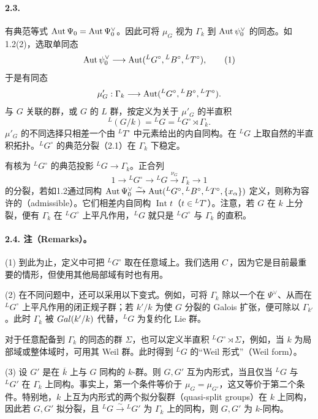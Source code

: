 \paragraph*{2.3.} 有典范等式 $\operatorname{Aut}\Psi_0=\operatorname{Aut}\Psi_0^\vee$。因此可将 $\mu_G$ 视为 $\Gamma_k$ 到 $\operatorname{Aut}\psi_0^\vee$ 的同态。如1.2(2)，选取单同态
\begin{equation}
 \operatorname{Aut}\psi_0^\vee\longrightarrow\operatorname{Aut}({}^LG^\circ,{}^LB^\circ,{}^LT^\circ),\tag{1}
\end{equation}
于是有同态
\[
 \mu'_G:\Gamma_k\longrightarrow\operatorname{Aut}({}^LG^\circ,{}^LB^\circ,{}^LT^\circ).
\]
与 $G$ 关联的群，或 $G$ 的 $L$ 群，按定义为关于 $\mu'_G$ 的半直积
\begin{equation}
 {}^L(G/k)={}^LG={}^LG^\circ\rtimes\Gamma_k.\tag{2}
\end{equation}
$\mu'_G$ 的不同选择只相差一个由 ${}^LT^\circ$ 中元素给出的内自同构。在 ${}^LG$ 上取自然的半直积拓扑。${}^LG^\circ$ 的典范分裂（2.1）在 $\Gamma_k$ 下稳定。

有核为 ${}^LG^\circ$ 的典范投影 ${}^LG\to\Gamma_k$。正合列
\begin{equation}
 1\longrightarrow{}^LG^\circ\longrightarrow{}^LG\xrightarrow{\nu_G}\Gamma_k\longrightarrow1\tag{3}
\end{equation}
的分裂，若如1.2通过同构 $\operatorname{Aut}\Psi_0^\vee\xrightarrow{\sim}\operatorname{Aut}({}^LG^\circ,{}^LB^\circ,{}^LT^\circ,\{x_\alpha\})$ 定义，则称为容许的（admissible）。它们相差内自同构 $\operatorname{Int}t$（$t\in{}^LT^\circ$）。注意，若 $G$ 在 $k$ 上分裂，便有 $\Gamma_k$ 在 ${}^LG^\circ$ 上平凡作用，${}^LG$ 就只是 ${}^LG^\circ$ 与 $\Gamma_k$ 的直积。

\paragraph*{2.4. 注（Remarks）。}
(1) 到此为止，定义中可把 ${}^LG^\circ$ 取在任意域上。我们选用 $C$，因为它是目前最重要的情形，但使用其他局部域有时也有用。

(2) 在不同问题中，还可以采用以下变式。例如，可将 $\Gamma_k$ 除以一个在 $\Psi^\vee$、从而在 ${}^LG^\circ$ 上平凡作用的闭正规子群；若 $k'/k$ 为使 $G$ 分裂的 Galois 扩张，便可除以 $\Gamma_{k'}$。此时 $\Gamma_k$ 被 $Gal(k'/k)$ 代替，${}^LG$ 为复约化 Lie 群。

对于任意配备到 $\Gamma_k$ 的同态的群 $\Sigma$，也可以定义半直积 ${}^LG^\circ\rtimes\Sigma$，例如，当 $k$ 为局部域或整体域时，可用其 Weil 群。此时得到 ${}^LG$ 的“Weil 形式”（Weil form）。

(3) 设 $G'$ 是在 $\overline k$ 上与 $G$ 同构的 $k$-群。则 $G,G'$ 互为内形式，当且仅当 ${}^LG$ 与 ${}^LG'$ 在 $\Gamma_k$ 上同构。事实上，第一个条件等价于 $\mu_G=\mu_{G'}$，这又等价于第二个条件。特别地，$k$ 上互为内形式的两个拟分裂群（quasi-split groups）在 $k$ 上同构，因此若 $G,G'$ 拟分裂，且 ${}^LG\xrightarrow{\sim}{}^LG'$ 为 $\Gamma_k$ 上的同构，则 $G,G'$ 为 $k$-同构。

